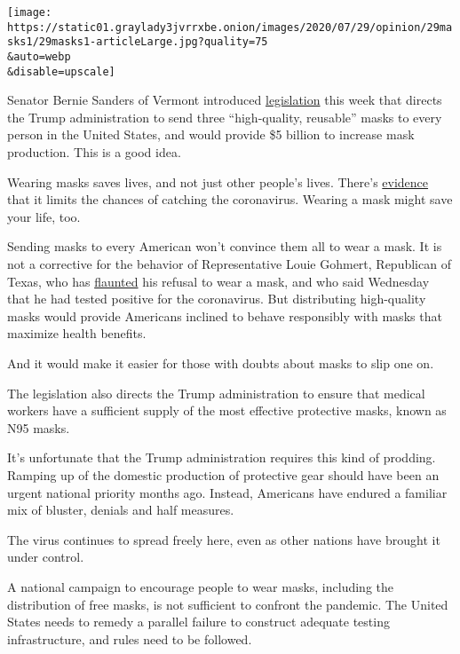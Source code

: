 \texttt{[image: https://static01.graylady3jvrrxbe.onion/images/2020/07/29/opinion/29masks1/29masks1-articleLarge.jpg?quality=75\\\&auto=webp\\\&disable=upscale]}

Senator Bernie Sanders of Vermont introduced
\href{https://www.sanders.senate.gov/newsroom/press-releases/sanders-leads-14-senators-in-introducing-masks-for-all-act-to-curb-deadly-coronavirus-surge}{legislation}
this week that directs the Trump administration to send three
``high-quality, reusable'' masks to every person in the United States,
and would provide \$5 billion to increase mask production. This is a
good idea.

Wearing masks saves lives, and not just other people's lives. There's
\href{https://www.nytimes3xbfgragh.onion/2020/07/27/health/coronavirus-mask-protection.html?searchResultPosition=4}{evidence}
that it limits the chances of catching the coronavirus. Wearing a mask
might save your life, too.

Sending masks to every American won't convince them all to wear a mask.
It is not a corrective for the behavior of Representative Louie Gohmert,
Republican of Texas, who has
\href{https://www.cnn.com/videos/politics/2020/07/29/texas-louie-gohmert-positive-covid-19-raju-nr-vpx.cnn}{flaunted}
his refusal to wear a mask, and who said Wednesday that he had tested
positive for the coronavirus. But distributing high-quality masks would
provide Americans inclined to behave responsibly with masks that
maximize health benefits.

And it would make it easier for those with doubts about masks to slip
one on.

The legislation also directs the Trump administration to ensure that
medical workers have a sufficient supply of the most effective
protective masks, known as N95 masks.

It's unfortunate that the Trump administration requires this kind of
prodding. Ramping up of the domestic production of protective gear
should have been an urgent national priority months ago. Instead,
Americans have endured a familiar mix of bluster, denials and half
measures.

The virus continues to spread freely here, even as other nations have
brought it under control.

A national campaign to encourage people to wear masks, including the
distribution of free masks, is not sufficient to confront the pandemic.
The United States needs to remedy a parallel failure to construct
adequate testing infrastructure, and rules need to be followed.

